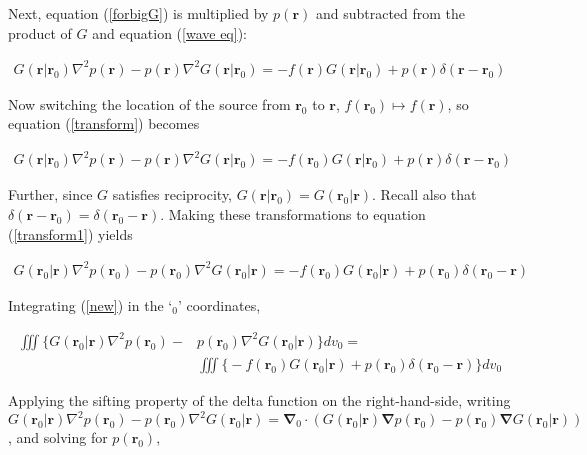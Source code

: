 \documentclass[12pt]{article}%
\begin{document}
\noindent Next, equation (\ref{forbigG}) is multiplied by $p(\boldsymbol r)$ and subtracted from the product of $G$ and equation (\ref{wave eq}):

\begin{align}\label{transform}
    G(\boldsymbol r| \boldsymbol r_0) \nabla^2 p(\boldsymbol r) - p(\boldsymbol r) \nabla^2 G(\boldsymbol r| \boldsymbol r_0) = -f(\boldsymbol r) G(\boldsymbol r| \boldsymbol r_0) + p(\boldsymbol r) \delta (\boldsymbol r - \boldsymbol r_0)
\end{align}

\noindent Now switching the location of the source from $\boldsymbol r_0$ to $\boldsymbol r$, $f(\boldsymbol r_0) \mapsto f(\boldsymbol r)$, so equation (\ref{transform}) becomes

\begin{align}\label{transform1}
    G(\boldsymbol r| \boldsymbol r_0) \nabla^2 p(\boldsymbol r) - p(\boldsymbol r) \nabla^2 G(\boldsymbol r| \boldsymbol r_0) = -f(\boldsymbol r_0) G(\boldsymbol r| \boldsymbol r_0) + p(\boldsymbol r) \delta (\boldsymbol r - \boldsymbol r_0)
\end{align}

\noindent Further, since $G$ satisfies reciprocity, $G(\boldsymbol r | \boldsymbol r_0) = G(\boldsymbol r_0 | \boldsymbol r)$. Recall also that $\delta(\boldsymbol r - \boldsymbol r_0) = \delta(\boldsymbol r_0 - \boldsymbol r)$. Making these transformations to equation (\ref{transform1}) yields

\begin{align}\label{new}
    G(\boldsymbol r_0| \boldsymbol r) \nabla^2 p(\boldsymbol r_0) - p(\boldsymbol r_0) \nabla^2 G(\boldsymbol r_0| \boldsymbol r) = -f(\boldsymbol r_0) G(\boldsymbol r_0| \boldsymbol r) + p(\boldsymbol r_0) \delta (\boldsymbol r_0 - \boldsymbol r)
\end{align}


\noindent Integrating (\ref{new}) in the `$_0$' coordinates,

\begin{align*}
    \iiint \big\lbrace G(\boldsymbol r_0| \boldsymbol r) \nabla^2 p(\boldsymbol r_0) -& p(\boldsymbol r_0) \nabla^2 G(\boldsymbol r_0| \boldsymbol r) \big\rbrace dv_0 = \\ &\iiint \big\lbrace -f(\boldsymbol r_0) G(\boldsymbol r_0| \boldsymbol r) + p(\boldsymbol r_0) \delta (\boldsymbol r_0 - \boldsymbol r)\big\rbrace dv_0
\end{align*}

\noindent Applying the sifting property of the delta function on the right-hand-side, writing $G(\boldsymbol r_0| \boldsymbol r) \nabla^2 p(\boldsymbol r_0) - p(\boldsymbol r_0) \nabla^2 G(\boldsymbol r_0| \boldsymbol r) = \boldsymbol \nabla_0 \cdot (G(\boldsymbol r_0| \boldsymbol r) \boldsymbol\nabla p(\boldsymbol r_0) - p(\boldsymbol r_0) \boldsymbol\nabla  G(\boldsymbol r_0| \boldsymbol r))$, and solving for $p(\boldsymbol r_0)$,
\end{document}
